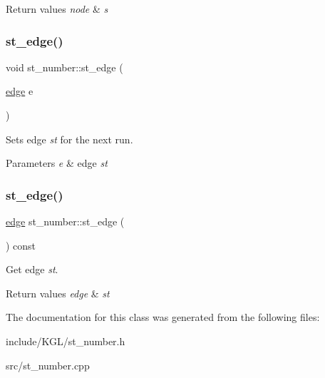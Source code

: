 \begin{DoxyRetVals}{Return values}
{\em node} & {\itshape s} \\
\hline
\end{DoxyRetVals}
\mbox{\label{classst__number_a1564af6f603160105643f22bf2f6955b}} 
\subsubsection{\texorpdfstring{st\+\_\+edge()}{st\_edge()}\hspace{0.1cm}{\footnotesize\ttfamily [1/2]}}
{\footnotesize\ttfamily void st\+\_\+number\+::st\+\_\+edge (\begin{DoxyParamCaption}\item[{\mbox{\hyperlink{classedge}{edge}}}]{e }\end{DoxyParamCaption})\hspace{0.3cm}{\ttfamily [inline]}}



Sets edge {\itshape st} for the next run. 


\begin{DoxyParams}{Parameters}
{\em e} & edge {\itshape st} \\
\hline
\end{DoxyParams}
\mbox{\label{classst__number_a8938bab7883ff4194d1a7b4c6d8fb471}} 
\subsubsection{\texorpdfstring{st\+\_\+edge()}{st\_edge()}\hspace{0.1cm}{\footnotesize\ttfamily [2/2]}}
{\footnotesize\ttfamily \mbox{\hyperlink{classedge}{edge}} st\+\_\+number\+::st\+\_\+edge (\begin{DoxyParamCaption}{ }\end{DoxyParamCaption}) const\hspace{0.3cm}{\ttfamily [inline]}}



Get edge {\itshape st}. 


\begin{DoxyRetVals}{Return values}
{\em edge} & {\itshape st} \\
\hline
\end{DoxyRetVals}


The documentation for this class was generated from the following files\+:\begin{DoxyCompactItemize}
\item 
include/\+K\+G\+L/st\+\_\+number.\+h\item 
src/st\+\_\+number.\+cpp\end{DoxyCompactItemize}
